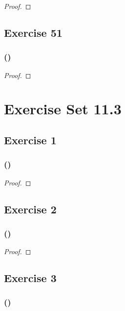 \documentclass[14pt]{extarticle}
\begin{document}
\begin{proof}

\end{proof}

\subsection{Exercise 51}

\subsubsection{()}

\begin{proof}

\end{proof}

\section{Exercise Set 11.3}

\subsection{Exercise 1}

\subsubsection{()}

\begin{proof}

\end{proof}

\subsection{Exercise 2}

\subsubsection{()}

\begin{proof}

\end{proof}

\subsection{Exercise 3}

\subsubsection{()}
\end{document}
